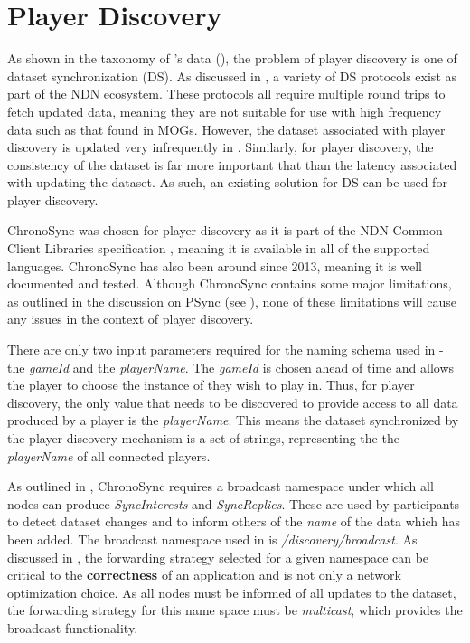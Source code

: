 \section{Player Discovery}\label{sec:des:discovery}
As shown in the taxonomy of \game{}'s data (), the problem of player discovery is one of dataset synchronization (DS). As discussed in , a variety of DS protocols exist as part of the NDN ecosystem. These protocols all require multiple round trips to fetch updated data, meaning they are not suitable for use with high frequency data such as that found in MOGs. However, the dataset associated with player discovery is updated very infrequently in \game. Similarly, for player discovery, the consistency of the dataset is far more important that than the latency associated with updating the dataset. As such, an existing solution for DS can be used for player discovery.

ChronoSync was chosen for player discovery as it is part of the NDN Common Client Libraries specification \cite{ndn-ccl}, meaning it is available in all of the supported languages. ChronoSync has also been around since 2013, meaning it is well documented and tested. Although ChronoSync contains some major limitations, as outlined in the discussion on PSync (see ), none of these limitations will cause any issues in the context of player discovery.

There are only two input parameters required for the naming schema used in \game{} - the \textit{gameId} and the \textit{playerName}. The \textit{gameId} is chosen ahead of time and allows the player to choose the instance of \game{} they wish to play in. Thus, for player discovery, the only value that needs to be discovered to provide access to all data produced by a player is the \textit{playerName}. This means the dataset synchronized by the player discovery mechanism is a set of strings, representing the the \textit{playerName} of all connected players.

\sloppy As outlined in , ChronoSync requires a broadcast namespace under which all nodes can produce \textit{SyncInterests} and \textit{SyncReplies}. These are used by participants to detect dataset changes and to inform others of the \textit{name} of the data which has been added. The broadcast namespace used in \game{} is \textit{\gameprefix{}/discovery/broadcast}. As discussed in , the forwarding strategy selected for a given namespace can be critical to the \textbf{correctness} of an application and is not only a network optimization choice. As all nodes must be informed of all updates to the dataset, the forwarding strategy for this name space must be \textit{multicast}, which provides the broadcast functionality.

